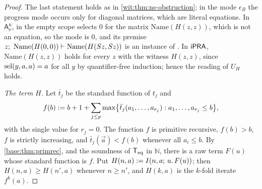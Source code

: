 \begin{proof}
The last statement holds as in \cref{wit:thm:ns-obstruction}; in the mode
$\epsilon_B$ the progress mode occurs only for diagonal matrices, which are
literal equations.  In $\mathsf{A}^{\mathrm n}_{\nu}$,  in the
empty scope selects $0$ for the matrix $\mathrm{Name}(H(z,z))$, which is not
an equation, so the mode is $0$, and its premise
$z;\ \mathrm{Name}(H(0,0))\proves\mathrm{Name}(H(\Suc z,\Suc z))$ is an
instance of .  In $\mathsf{iPRA}$, $\mathrm{Name}(H(z,z))$ holds for
every $z$ with the witness $H(z,z)$, since $\operatorname{sel}(y,a,a)=a$ for all $y$ by
quantifier-free induction; hence the reading of $U_H$ holds.

\emph{The term $H$.}  Let $\bar t_j$ be the standard function of $t_j$ and
\[
 f(b)\mathrel{:=} b+1+\sum_{j\le p}\max\bigl\{\bar t_j(a_1,\dots,a_{r_j}):
   a_1,\dots,a_{r_j}\le b\bigr\},
\]
with the single value for $r_j=0$.  The function $f$ is primitive recursive,
$f(b)>b$, $f$ is strictly increasing, and $\bar t_j(\vec a)<f(b)$ whenever
all $a_i\le b$.  By \cref{base:thm:primrec}, and the soundness of $\mathsf{T}_{\mathrm{eq}}$ in
$\mathbb{N}$, there is a raw term $F(u)$ whose standard function is $f$.  Put
$H(n,a)\mathrel{:=}I(n,a;\,u.\,F(u))$; then $H(n,a)\ge H(n',a)$ whenever $n\ge n'$,
and $H(k,a)$ is the $k$-fold iterate $f^k(a)$.


\end{proof}
